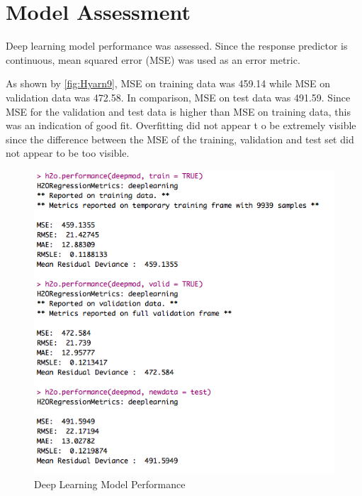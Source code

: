 \documentclass[12pt,twoside]{amherstthesis}
\begin{document}
  \clearpage 
  
  \section{Model Assessment}\label{model-assessment-2}
  
  Deep learning model performance was assessed. Since the response
  predictor is continuous, mean squared error (MSE) was used as an error
  metric.
  
  As shown by \autoref{fig:Hyarn9}, MSE on training data was 459.14 while
  MSE on validation data was 472.58. In comparison, MSE on test data was
  491.59. Since MSE for the validation and test data is higher than MSE on
  training data, this was an indication of good fit. Overfitting did not
  appear t o be extremely visible since the difference between the MSE of
  the training, validation and test set did not appear to be too visible.
  
  \begin{Shaded}
  \begin{Highlighting}[]
   \NormalTok{)  }
   \NormalTok{)  }
   
  \end{Highlighting}
  \end{Shaded}
  
  \begin{figure}[htbp]
  \centering
  \includegraphics[scale = 0.7,angle = 0]{figure/deepModml.png}
  \caption[Deep Learning Model Performance]{\normalsize{Deep Learning Model Performance}}
  \label{fig:Hyarn9}
  \end{figure}
  
\end{document}
